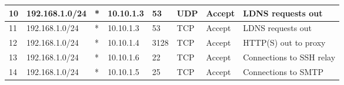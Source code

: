 \documentclass[a4paper, 11pt, oneside]{article}
\begin{document}
\begin{table}[H]
{\begin{tabular}{|llllllll|}
\multicolumn{1}{|l|}{10}                         & \multicolumn{1}{l|}{192.168.1.0/24}                                               & \multicolumn{1}{l|}{*}                                                              & \multicolumn{1}{l|}{10.10.1.3}                                                         & \multicolumn{1}{l|}{53}                                                                  & \multicolumn{1}{l|}{UDP}               & \multicolumn{1}{l|}{Accept}          & LDNS requests out                      \\ \hline
\multicolumn{1}{|l|}{11}                         & \multicolumn{1}{l|}{192.168.1.0/24}                                               & \multicolumn{1}{l|}{*}                                                              & \multicolumn{1}{l|}{10.10.1.3}                                                         & \multicolumn{1}{l|}{53}                                                                  & \multicolumn{1}{l|}{TCP}               & \multicolumn{1}{l|}{Accept}          & LDNS requests out                      \\ \hline
\multicolumn{1}{|l|}{12}                        & \multicolumn{1}{l|}{192.168.1.0/24}                                               & \multicolumn{1}{l|}{*}                                                              & \multicolumn{1}{l|}{10.10.1.4}                                                         & \multicolumn{1}{l|}{3128}                                                                & \multicolumn{1}{l|}{TCP}               & \multicolumn{1}{l|}{Accept}          & HTTP(S) out to proxy                    \\ \hline
\multicolumn{1}{|l|}{13}                        & \multicolumn{1}{l|}{192.168.1.0/24}                                               & \multicolumn{1}{l|}{*}                                                              & \multicolumn{1}{l|}{10.10.1.6}                                                         & \multicolumn{1}{l|}{22}                                                                  & \multicolumn{1}{l|}{TCP}               & \multicolumn{1}{l|}{Accept}          & Connections to SSH relay               \\ \hline
\multicolumn{1}{|l|}{14}                        & \multicolumn{1}{l|}{192.168.1.0/24}                                               & \multicolumn{1}{l|}{*}                                                              & \multicolumn{1}{l|}{10.10.1.5}                                                         & \multicolumn{1}{l|}{25}                                                                  & \multicolumn{1}{l|}{TCP}               & \multicolumn{1}{l|}{Accept}          & Connections to SMTP                    \\ \hline

\end{tabular}}
\end{table}
\end{document}
